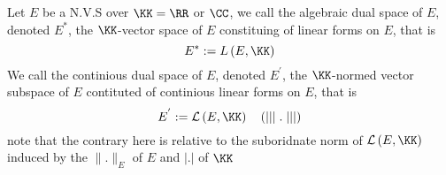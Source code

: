 % 
% 

\lecday[2025-02-25]

% 
\begin{definition}[]
Let $E $ be a N.V.S 
over $\KK = \RR $  or $\CC  $, we call the algebraic dual space
of $E$, denoted $E^{*}$, the $\KK $-vector space of $E $ constituing
of linear forms on $E $, that is 
\[
E^{*} := 
L \left( E,\KK \right)
\]
We call the continious dual space of $E $, denoted
$E^{'} $, the $\KK $-normed vector subspace of 
$E$ contituted of continious linear forms on $E $, that is 
\[
E^{'} := 
\mathcal{L} \left( E,\KK \right) 
\quad \left( \mid \mid \mid  . \mid \mid \mid  \right)
\]
note that the contrary here is relative to 
the suboridnate norm 
of $\mathcal{L} \left( E,\KK \right)$ induced
by the $\| . \| _{E} $  
of $E $ and $\left| . \right| $  of $\KK $ 
\end{definition}
